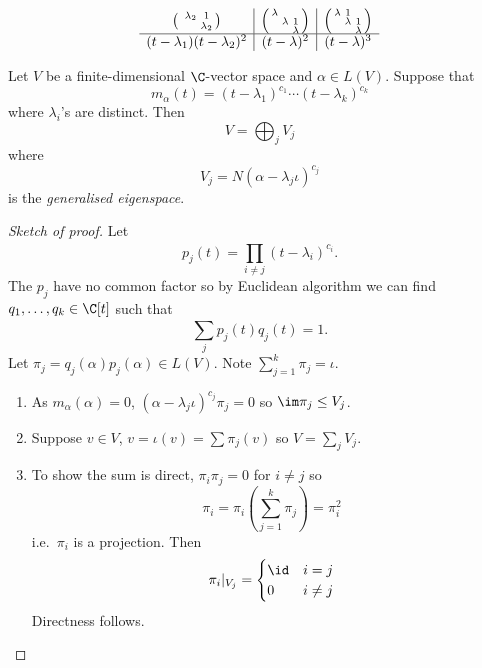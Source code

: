 \documentclass[a4paper]{article}
\theoremstyle{definition}
\begin{document}
\begin{eg}
\begin{enumerate}
\[\begin{array}[h]{c|c|c}
\begin{psmallmatrix}
        & \lambda_2 & 1 \\
        & & \lambda_2
      \end{psmallmatrix}
        &
          \begin{psmallmatrix}
            \lambda & & \\
            & \lambda & 1 \\
            & & \lambda
          \end{psmallmatrix}
        &
          \begin{psmallmatrix}
            \lambda & 1 & \\
            & \lambda & 1 \\
            & & \lambda
          \end{psmallmatrix}
      \\ \hline
      (t - \lambda_1)(t - \lambda_2)^2 & (t - \lambda)^2 & (t - \lambda)^3
    \end{array}
  \]
  \end{enumerate}
\end{eg}

\begin{theorem}
  \label{thm:generalised eigenspace decomposition}
  Let \(V\) be a finite-dimensional \(\C\)-vector space and \(\alpha \in L(V)\). Suppose that
  \[
    m_\alpha(t) = (t - \lambda_1)^{c_1} \cdots (t - \lambda_k)^{c_k}
  \]
  where \(\lambda_i\)'s are distinct. Then
  \[
    V = \bigoplus_j V_j
  \]
  where
  \[
    V_j = N(\alpha - \lambda_j \iota)^{c_j}
  \]
  is the \emph{generalised eigenspace}.
\end{theorem}

\begin{proof}[Sketch of proof]
  Let
  \[
    p_j(t) = \prod_{i \neq j}^{ } (t - \lambda_i)^{c_i}.
  \]
  The \(p_j\) have no common factor so by Euclidean algorithm we can find \(q_1, \dots, q_k \in \C[t]\) such that
  \[
    \sum_{j}^{ } p_j(t)q_j(t) = 1.
  \]
  Let \(\pi_j = q_j(\alpha)p_j(\alpha) \in L(V)\). Note \(\sum_{j = 1}^{k} \pi_j = \iota\).
  \begin{enumerate}
  \item As \(m_\alpha(\alpha) = 0\), \((\alpha - \lambda_j \iota)^{c_j} \pi_j = 0\) so \(\im \pi_j \leq V_j\).
  \item Suppose \(v \in V\), \(v = \iota(v) = \sum \pi_j(v)\) so \(V = \sum_j V_j\).
  \item To show the sum is direct, \(\pi_i \pi_j = 0\) for \(i \neq j\) so
    \[
      \pi_i = \pi_i \left( \sum_{j = 1}^{k} \pi_j \right) = \pi_i^2
    \]
    i.e.\ \(\pi_i\) is a projection. Then
    \[
      \pi_i |_{V_j} =
      \begin{cases}
        \id & i = j \\
        0 & i \neq j
      \end{cases}
    \]
    Directness follows.
  \end{enumerate}
\end{proof}
\end{document}

